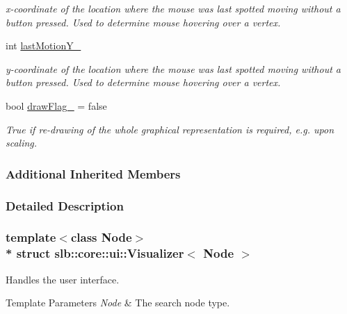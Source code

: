\begin{DoxyCompactItemize}
\begin{DoxyCompactList}\small\item\em x-\/coordinate of the location where the mouse was last spotted moving without a button pressed. Used to determine mouse hovering over a vertex. \end{DoxyCompactList}\item 
int \hyperlink{structslb_1_1core_1_1ui_1_1Visualizer_a93a21c44551dccb9d4fa4f58572cd484}{last\+Motion\+Y\+\_\+}\hypertarget{structslb_1_1core_1_1ui_1_1Visualizer_a93a21c44551dccb9d4fa4f58572cd484}{}\label{structslb_1_1core_1_1ui_1_1Visualizer_a93a21c44551dccb9d4fa4f58572cd484}

\begin{DoxyCompactList}\small\item\em y-\/coordinate of the location where the mouse was last spotted moving without a button pressed. Used to determine mouse hovering over a vertex. \end{DoxyCompactList}\item 
bool \hyperlink{structslb_1_1core_1_1ui_1_1Visualizer_ac248b6d8fb7805ca9d73f2e0ec5982cf}{draw\+Flag\+\_\+} = false\hypertarget{structslb_1_1core_1_1ui_1_1Visualizer_ac248b6d8fb7805ca9d73f2e0ec5982cf}{}\label{structslb_1_1core_1_1ui_1_1Visualizer_ac248b6d8fb7805ca9d73f2e0ec5982cf}

\begin{DoxyCompactList}\small\item\em {\ttfamily True} if re-\/drawing of the whole graphical representation is required, e.\+g. upon scaling. \end{DoxyCompactList}\end{DoxyCompactItemize}
\subsubsection*{Additional Inherited Members}


\subsubsection{Detailed Description}
\subsubsection*{template$<$class Node$>$\\*
struct slb\+::core\+::ui\+::\+Visualizer$<$ Node $>$}

Handles the user interface. 


\begin{DoxyTemplParams}{Template Parameters}
{\em Node} & The search node type. \\
\hline
\end{DoxyTemplParams}


